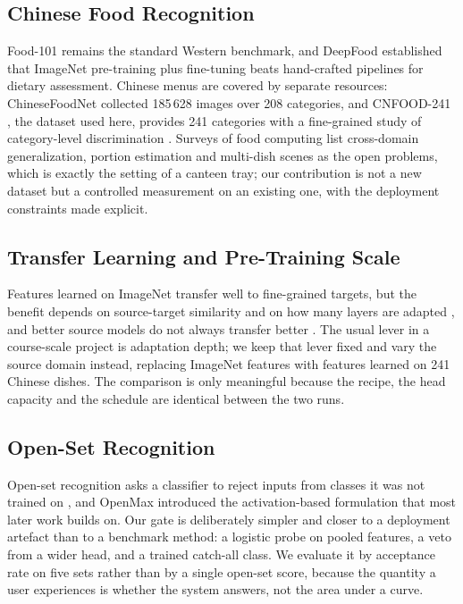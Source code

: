 \documentclass[conference]{IEEEtran}
\begin{document}
\subsection{Chinese Food Recognition}
Food-101 \cite{bossard2014food101} remains the standard Western benchmark, and
DeepFood \cite{liu2016deepfood} established that ImageNet pre-training plus
fine-tuning beats hand-crafted pipelines for dietary assessment. Chinese menus
are covered by separate resources: ChineseFoodNet \cite{chen2017chinesefoodnet}
collected 185\,628 images over 208 categories, and CNFOOD-241 \cite{cnfood241},
the dataset used here, provides 241 categories with a fine-grained study of
category-level discrimination \cite{xiong2026cnfood}. Surveys of food computing
\cite{zhang2023foodsurvey} list cross-domain generalization, portion estimation
and multi-dish scenes as the open problems, which is exactly the setting of a
canteen tray; our contribution is not a new dataset but a controlled measurement
on an existing one, with the deployment constraints made explicit.

\subsection{Transfer Learning and Pre-Training Scale}
Features learned on ImageNet \cite{deng2009imagenet} transfer well to
fine-grained targets, but the benefit depends on source-target similarity and on
how many layers are adapted \cite{yosinski2014transfer}, and better source models
do not always transfer better \cite{kornblith2019better}. The usual lever in a
course-scale project is adaptation depth; we keep that lever fixed and vary the
source domain instead, replacing ImageNet features with features learned on 241
Chinese dishes. The comparison is only meaningful because the recipe, the head
capacity and the schedule are identical between the two runs.

\subsection{Open-Set Recognition}
Open-set recognition asks a classifier to reject inputs from classes it was not
trained on \cite{scheirer2013openset}, and OpenMax \cite{bendale2016openset}
introduced the activation-based formulation that most later work builds on. Our
gate is deliberately simpler and closer to a deployment artefact than to a
benchmark method: a logistic probe on pooled features, a veto from a wider head,
and a trained catch-all class. We evaluate it by acceptance rate on five sets
rather than by a single open-set score, because the quantity a user experiences
is whether the system answers, not the area under a curve.
\end{document}
